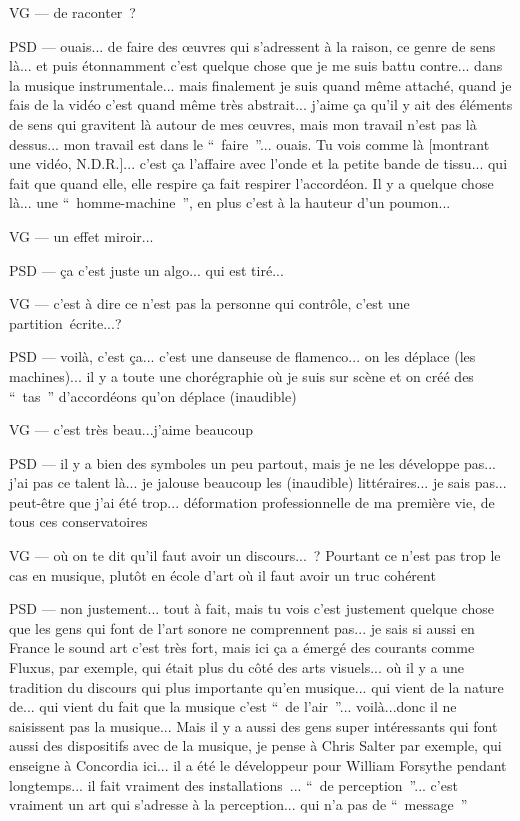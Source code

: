 VG — de raconter ?

PSD — ouais... de faire des œuvres qui s'adressent à la raison, ce genre de sens là... et puis étonnamment c'est quelque chose que je me suis battu contre... dans la musique instrumentale... mais finalement je suis quand même attaché, quand je fais de la vidéo c'est quand même très abstrait... j'aime ça qu'il y ait des éléments de sens qui gravitent là autour de mes œuvres, mais mon travail n'est pas là dessus... mon travail est dans le “ faire ”... ouais. Tu vois comme là [montrant une vidéo, N.D.R.]... c'est ça l'affaire avec l'onde et la petite bande de tissu... qui fait que quand elle, elle respire ça fait respirer l'accordéon. Il y a quelque chose là... une “ homme-machine ”, en plus c'est à la hauteur d'un poumon...

VG — un effet miroir...

PSD — ça c'est juste un algo... qui est tiré...

VG — c'est à dire ce n'est pas la personne qui contrôle, c'est une partition écrite...?

PSD — voilà, c'est ça... c'est une danseuse de flamenco...  on les déplace (les machines)... il y a toute une chorégraphie où je suis sur scène et on créé des “ tas ” d'accordéons qu'on déplace (inaudible)

VG — c'est très beau...j'aime beaucoup

PSD — il y a bien des symboles un peu partout, mais je ne les développe pas... j'ai pas ce talent là... je jalouse beaucoup les (inaudible)  littéraires... je sais pas... peut-être que j'ai été trop... déformation professionnelle de ma première vie, de tous ces conservatoires

VG — où on te dit qu'il faut avoir un discours... ? Pourtant ce n'est pas trop le cas en musique, plutôt en école d'art où il faut avoir un truc cohérent

PSD — non justement... tout à fait, mais tu vois c'est justement quelque chose que les gens qui font de l'art sonore ne comprennent pas... je sais si aussi en France le sound art c'est très fort, mais ici ça a émergé des courants comme Fluxus, par exemple, qui était plus du côté des arts visuels... où il y a une tradition du discours qui plus importante qu'en musique... qui vient de la nature de... qui vient du fait que la musique c'est “ de l'air ”... voilà...donc  il ne saisissent pas la musique... Mais il y a aussi des gens super intéressants qui font aussi des dispositifs avec de la musique, je pense à Chris Salter par exemple, qui enseigne à Concordia ici... il a été le développeur pour William Forsythe pendant longtemps... il fait vraiment des installations ... “ de perception ”... c'est vraiment un art qui s'adresse à la  perception... qui n'a pas de “ message ”

